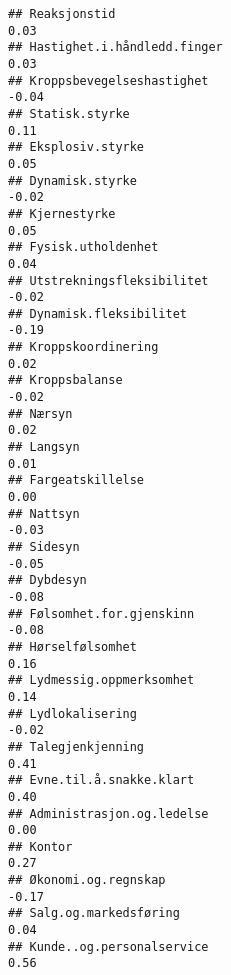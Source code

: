 \documentclass[
]{article}
\begin{document}
\begin{verbatim}
## Reaksjonstid                                                                      0.03
## Hastighet.i.håndledd.finger                                                       0.03
## Kroppsbevegelseshastighet                                                        -0.04
## Statisk.styrke                                                                    0.11
## Eksplosiv.styrke                                                                  0.05
## Dynamisk.styrke                                                                  -0.02
## Kjernestyrke                                                                      0.05
## Fysisk.utholdenhet                                                                0.04
## Utstrekningsfleksibilitet                                                        -0.02
## Dynamisk.fleksibilitet                                                           -0.19
## Kroppskoordinering                                                                0.02
## Kroppsbalanse                                                                    -0.02
## Nærsyn                                                                            0.02
## Langsyn                                                                           0.01
## Fargeatskillelse                                                                  0.00
## Nattsyn                                                                          -0.03
## Sidesyn                                                                          -0.05
## Dybdesyn                                                                         -0.08
## Følsomhet.for.gjenskinn                                                          -0.08
## Hørselfølsomhet                                                                   0.16
## Lydmessig.oppmerksomhet                                                           0.14
## Lydlokalisering                                                                  -0.02
## Talegjenkjenning                                                                  0.41
## Evne.til.å.snakke.klart                                                           0.40
## Administrasjon.og.ledelse                                                         0.00
## Kontor                                                                            0.27
## Økonomi.og.regnskap                                                              -0.17
## Salg.og.markedsføring                                                             0.04
## Kunde..og.personalservice                                                         0.56

\end{verbatim}
\end{document}

